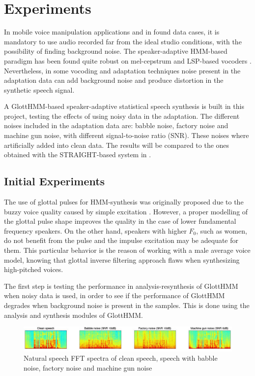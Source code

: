 \section{Experiments}
\label{experiments}
In mobile voice manipulation applications and in found data cases, it is mandatory to use audio recorded far from the ideal studio conditions, with the possibility of finding background noise.
%
The speaker-adaptive HMM-based paradigm has been found quite robust on mel-cepstrum \cite{karhila_jstsp_14, yamagishi2008robustness} and LSP-based vocoders \cite{yanagisawa2013noise}.
%
Nevertheless, in some vocoding and adaptation techniques noise present in the adaptation data can add background noise and produce distortion in the synthetic speech signal.

A GlottHMM-based speaker-adaptive statistical speech synthesis is built in this project, testing the effects of using noisy data in the adaptation.
%
The different noises included in the adaptation data are: babble noise, factory noise and machine gun noise, with different signal-to-noise ratio (SNR).
%
These noises where artificially added into clean data.
%
The results will be compared to the ones obtained with the STRAIGHT-based system in \cite{karhila_jstsp_14}.

\subsection{Initial Experiments}
\label{experiments_initial}
The use of glottal pulses for HMM-synthesis was originally proposed due to the buzzy voice quality caused by simple excitation \cite{raitio2008hmm}.
%
However, a proper modelling of the glottal pulse shape improves the quality in the case of lower fundamental frequency speakers. On the other hand, speakers with higher $F_{0}$, such as women, do not benefit from the pulse and the impulse excitation may be adequate for them.
%
This particular behavior is the reason of working with a male average voice model, knowing that glottal inverse filtering approach flaws when synthesizing high-pitched voices.

The first step is testing the performance in analysis-resynthesis of GlottHMM when noisy data is used, in order to see if the performance of GlottHMM degrades when background noise is present in the samples. This is done using the analysis and synthesis modules of GlottHMM.

\begin{figure}[!htb]
\begin{centering}
\includegraphics[width=\textwidth]{images/natural_spectra.jpg}
\caption{Natural speech FFT spectra of clean speech, speech with babble noise, factory noise and machine gun noise}
\label{fig:natural_spectra}
\end{centering}
\end{figure}

